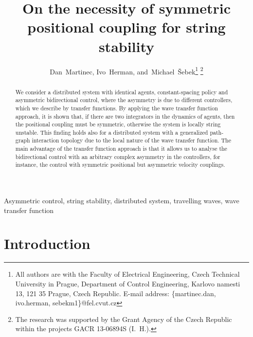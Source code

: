 \documentclass[10pt,twocolumn,twoside]{IEEEtran}
\theoremstyle{definition}
\newcommand{\revA}{Black}
\begin{document}
\title{On the necessity of symmetric positional coupling for string stability}




\author{Dan~Martinec, Ivo~Herman, and~Michael~\v{S}ebek\thanks{All authors are with the Faculty of Electrical Engineering, Czech
Technical University in Prague, Department of Control Engineering, Karlovo
namesti 13, 121 35 Prague, Czech Republic.
E-mail address:
\{martinec.dan, ivo.herman, sebekm1\}@fel.cvut.cz }
\thanks{The research
was supported by the Grant Agency of the Czech Republic within the projects GACR
13-06894S (I.~H.).}}

\maketitle



\begin{abstract}
We consider a distributed system with identical agents, constant-spacing policy and asymmetric bidirectional control, where the asymmetry is due to different controllers, which we describe by transfer functions. By applying the wave transfer function approach, it is shown that, if there are two integrators in the dynamics of agents, then the positional coupling must be symmetric, otherwise the system is locally string unstable. This finding holds also for a distributed system with a {\color{\revA}generalized path-graph} interaction topology due to the local nature of the wave transfer function. The main advantage of the transfer function approach is that it allows us to analyse the bidirectional control with an arbitrary complex asymmetry in the controllers, for instance, the control with symmetric positional but asymmetric velocity couplings.



\end{abstract}





\begin{IEEEkeywords}
Asymmetric control, string stability, distributed system, travelling waves, wave transfer function
\end{IEEEkeywords}

\IEEEpeerreviewmaketitle



\section{Introduction}
\end{document}
